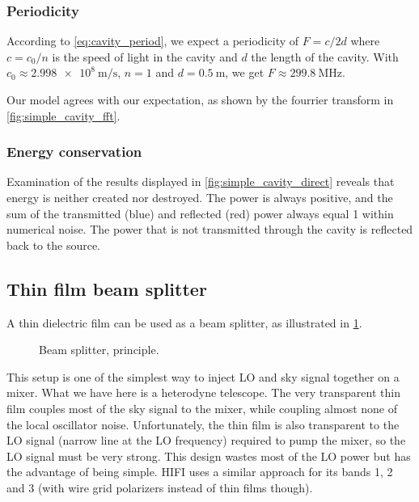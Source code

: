 
\subsubsection{Periodicity}
According to \cref{eq:cavity_period}, we expect a periodicity of $F=c/2d$ where $c=c_0/n$ is the speed of light in the cavity and $d$ the length of the cavity.
With $c_0\approx \SI{2.998e8}{\meter\per\second}$, $n=1$ and $d=\SI{0.5}{\meter}$, we get $F \approx \SI{299.8}{\mega\hertz}$.

Our model agrees with our expectation, as shown by the fourrier transform in \cref{fig:simple_cavity_fft}.




\subsubsection{Energy conservation}
Examination of the results displayed in \cref{fig:simple_cavity_direct} reveals that energy is neither created nor destroyed.
The power is always positive, and the sum of the transmitted (blue) and reflected (red) power always equal 1 within numerical noise.
The power that is not transmitted through the cavity is reflected back to the source.




\subsection{Thin film beam splitter}

A thin dielectric film can be used as a beam splitter, as illustrated in \cref{fig:beam_splitter_principle}.
\begin{figure}[hbtp]
    \centering
    
    \caption{Beam splitter, principle.}
    \label{fig:beam_splitter_principle}
\end{figure}

This setup is one of the simplest way to inject LO and sky signal together on a mixer.
What we have here is a heterodyne telescope.
The very transparent thin film couples most of the sky signal to the mixer, while coupling almost none of the local oscillator noise.
Unfortunately, the thin film is also transparent to the LO signal (narrow line at the LO frequency) required to pump the mixer, so the LO signal must be very strong.
This design wastes most of the LO power but has the advantage of being simple.
HIFI uses a similar approach for its bands 1, 2 and 3 (with wire grid polarizers instead of thin films though).

